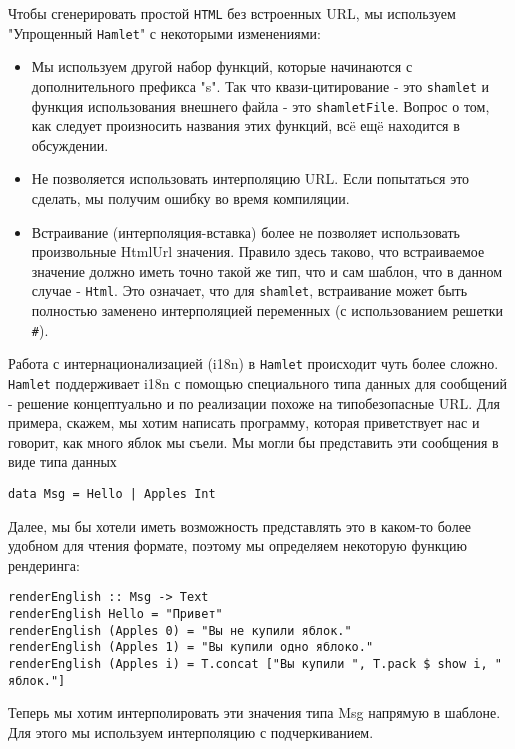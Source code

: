 Чтобы сгенерировать простой \texttt{HTML} без встроенных URL, мы используем
"Упрощенный \texttt{Hamlet}" с некоторыми изменениями:

\begin{itemize}
\item Мы используем другой набор функций, которые начинаются с дополнительного
префикса "s". Так что квази-цитирование - это \texttt{shamlet} и функция
использования внешнего файла - это \texttt{shamletFile}. Вопрос о том, как следует произносить
названия этих функций, всë ещë находится в обсуждении.
\item Не позволяется использовать интерполяцию URL. Если попытаться это сделать,
мы получим ошибку во время компиляции.
\item Встраивание (интерполяция-вставка) более не позволяет использовать произвольные
HtmlUrl значения. Правило здесь таково, что встраиваемое значение должно иметь
точно такой же тип, что и сам шаблон, что в данном случае - \lstinline!Html!. Это означает,
что для \texttt{shamlet}, встраивание может быть полностью заменено интерполяцией
переменных (с использованием решетки \texttt{\#}).
\end{itemize}

Работа с интернационализацией (i18n) в \texttt{Hamlet} происходит чуть более сложно.
\texttt{Hamlet} поддерживает i18n с помощью специального типа данных для сообщений - решение
концептуально и по реализации похоже на типобезопасные URL. Для примера, скажем,
мы хотим написать программу, которая приветствует нас и говорит, как много яблок
мы съели. Мы могли бы представить эти сообщения в виде типа данных

\begin{lstlisting}
data Msg = Hello | Apples Int
\end{lstlisting}

Далее, мы бы хотели иметь возможность представлять это в каком-то более удобном
для чтения формате, поэтому мы определяем некоторую функцию рендеринга:
\begin{lstlisting}
renderEnglish :: Msg -> Text
renderEnglish Hello = "Привет"
renderEnglish (Apples 0) = "Вы не купили яблок."
renderEnglish (Apples 1) = "Вы купили одно яблоко."
renderEnglish (Apples i) = T.concat ["Вы купили ", T.pack $ show i, " яблок."]
\end{lstlisting}

Теперь мы хотим интерполировать эти значения типа Msg напрямую в шаблоне.
Для этого мы используем интерполяцию с подчеркиванием.

